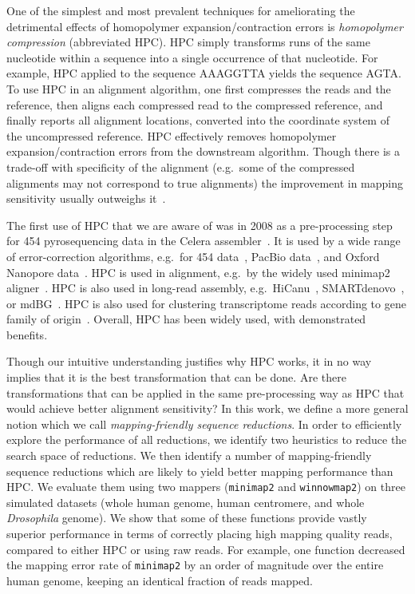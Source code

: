 \documentclass[
  11pt,
  twoside,
  BCOR=10mm,
  listof=totoc]{scrbook}
\begin{document}
One of the simplest and most prevalent techniques for ameliorating the detrimental effects of homopolymer expansion/contraction errors is \emph{homopolymer compression} (abbreviated HPC). HPC simply transforms runs of the same nucleotide within a sequence into a single occurrence of that nucleotide. For example, HPC applied to the sequence AAAGGTTA yields the sequence AGTA. To use HPC in an alignment algorithm, one first compresses the reads and the reference, then aligns each compressed read to the compressed reference, and finally reports all alignment locations, converted into the coordinate system of the uncompressed reference. HPC effectively removes homopolymer expansion/contraction errors from the downstream algorithm. Though there is a trade-off with specificity of the alignment (e.g.~some of the compressed alignments may not correspond to true alignments) the improvement in mapping sensitivity usually outweighs it~\autocite{liMinimap2PairwiseAlignment2018}.

The first use of HPC that we are aware of was in 2008 as a pre-processing step for 454 pyrosequencing data in the Celera assembler~\autocite{millerAggressiveAssemblyPyrosequencing2008}. It is used by a wide range of error-correction algorithms, e.g.~for 454 data~\autocite{braggFastAccurateErrorcorrection2012}, PacBio data~\autocite{auImprovingPacBioLong2012}, and Oxford Nanopore data~\autocite{sahlinErrorCorrectionEnables2021}. HPC is used in alignment, e.g.~by the widely used minimap2 aligner~\autocite{liMinimap2PairwiseAlignment2018}. HPC is also used in long-read assembly, e.g.~HiCanu~\autocite{nurkHiCanuAccurateAssembly2020}, SMARTdenovo~\autocite{liuSMARTdenovoNovoAssembler2021}, or mdBG~\autocite{ekimMinimizerspaceBruijnGraphs2021}. HPC is also used for clustering transcriptome reads according to gene family of origin~\autocite{sahlinNovoClusteringLongRead2020}. Overall, HPC has been widely used, with demonstrated benefits.

Though our intuitive understanding justifies why HPC works, it in no way implies that it is the best transformation that can be done. Are there transformations that can be applied in the same pre-processing way as HPC that would achieve better alignment sensitivity? In this work, we define a more general notion which we call \emph{mapping-friendly sequence reductions}. In order to efficiently explore the performance of all reductions, we identify two heuristics to reduce the search space of reductions. We then identify a number of mapping-friendly sequence reductions which are likely to yield better mapping performance than HPC. We evaluate them using two mappers (\texttt{minimap2} and \texttt{winnowmap2}) on three simulated datasets (whole human genome, human centromere, and whole \emph{Drosophila} genome). We show that some of these functions provide vastly superior performance in terms of correctly placing high mapping quality reads, compared to either HPC or using raw reads. For example, one function decreased the mapping error rate of \texttt{minimap2} by an order of magnitude over the entire human genome, keeping an identical fraction of reads mapped.
\end{document}
